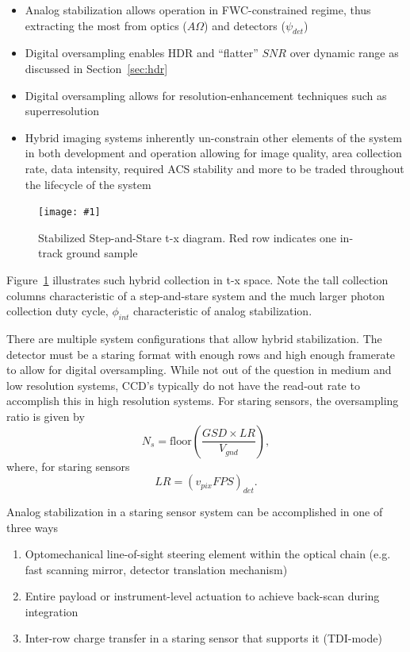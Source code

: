 \documentclass[10pt,journal]{IEEEtran}  %
\newcommand{\includefigure}[3]
{
  \begin{figure}[h!]
  \centering
  \texttt{[image: \#1]}
  \caption[]{#3}
  \label{#2}
  \end{figure}
}
\begin{document}
\begin{itemize}
    \item Analog stabilization allows operation in FWC-constrained regime, thus extracting the most from optics ($A\Omega$) and detectors ($\psi_{det}$)
    \item Digital oversampling enables HDR and ``flatter'' $SNR$ over dynamic range as discussed in Section~\ref{sec:hdr}
    \item Digital oversampling allows for resolution-enhancement techniques such as superresolution
    \item Hybrid imaging systems inherently un-constrain other elements of the system in both development and operation allowing for image quality, area collection rate, data intensity, required ACS stability and more to be traded throughout the lifecycle of the system
\end{itemize}

\includefigure{figures/stab_step_stare.pgf}{fig:stab_step_stare}{Stabilized Step-and-Stare t-x diagram.  Red row indicates one in-track ground sample}

Figure~\ref{fig:stab_step_stare} illustrates such hybrid collection in t-x space.  Note the tall collection columns characteristic of a step-and-stare system and the much larger photon collection duty cycle, $\phi_{int}$ characteristic of analog stabilization.  

There are multiple system configurations that allow hybrid stabilization.  The detector must be a staring format with enough rows and high enough framerate to allow for digital oversampling.  While not out of the question in medium and low resolution systems, CCD's typically do not have the read-out rate to accomplish this in high resolution systems.  For staring sensors, the oversampling ratio is given by
\begin{equation}
    N_s = \text{floor}\left(\frac{GSD \times LR}{V_{gnd}}\right),
\end{equation}
where, for staring sensors
\begin{equation}
\label{eq:lr_framing}    
LR = \left(v_{pix}FPS\right)_{det}.
\end{equation}

Analog stabilization in a staring sensor system can be accomplished in one of three ways

\begin{enumerate}
    \item Optomechanical line-of-sight steering element within the optical chain (e.g. fast scanning mirror, detector translation mechanism) \cite{patent:dirk}
    \item Entire payload or instrument-level actuation to achieve back-scan during integration \cite{patent:jonny}
    \item Inter-row charge transfer in a staring sensor that supports it (TDI-mode)
\end{enumerate}
\end{document}
